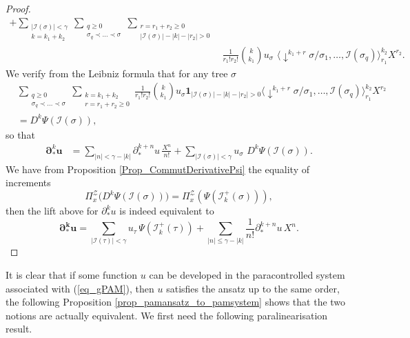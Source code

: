 \documentclass[11pt]{preprint}
\newcommand{\mcI}{\mathcal{I}}
\newcommand{\mcZ}{\mathcal{Z}}
\def\eqref#1{(\ref{#1})}
\renewcommand{\lg}{\langle}
\newcommand{\rg}{\rangle}
\begin{document}
\begin{proof}
\begin{align*}
				+ \sum_{\substack{|\mcI(\sigma)|<\gamma \\ k=k_1+k_2} }\sum_{\substack{q\geq 0 \\ \sigma_q\prec\dots\prec\sigma}} \sum_{\substack{ r=r_1+r_2 \geq0 \\ |\mcI(\sigma)|-|k|-|r_2|>0 }} \\ & \frac{1}{r_1!r_2!}\binom{k}{k_1}   u_\sigma \,\, \lg \downarrow^{k_1+r} \sigma/\sigma_1,\dots,\mcI(\sigma_q)    \rg^{k_2}_{r_1}X^{r_2} .
	\end{align*}
	We verify from the Leibniz formula that for any tree $\sigma$
	\begin{align*}&\sum_{\substack{q\geq 0 \\ \sigma_q\prec\dots\prec\sigma}}\sum_{\substack{k=k_1+k_2\\ r=r_1+r_2\geq 0}}\frac{1}{r_1!r_2!}\binom{k}{k_1} u_\sigma \mathbf{1}_{|\mcI(\sigma)|-|k|-|r_2|>0}\lg \downarrow^{k_1+r} \sigma/\sigma_1,\dots,\mcI(\sigma_q)    \rg^{k_2}_{r_1}X^{r_2} 
		\\
		&= D^k \Psi(\mcI(\sigma)),
		\end{align*}
	so that 
	\begin{align*}
		{\bm \partial_*^{k}}{\bm u} &= \sum_{|n|<\gamma-|k|}\partial_*^{k+n} u \, \frac{X^n}{n!} 
	+ \sum_{|\mcI(\sigma)|<\gamma } u_\sigma \,\, D^k\Psi(\mcI(\sigma)).
	\end{align*}
	We have from Proposition \ref{Prop_CommutDerivativePsi} the equality of increments $$\Pi_x^\mcZ\big( D^k\Psi(\mcI(\sigma))\big)=\Pi^\mcZ_x\left(\Psi(\mcI_k^+(\sigma))\right),$$ then the lift above for $\partial^k_*u$ is indeed equivalent to $$	\bm{\partial_{*}^{k} u} = \sum_{|\mcI(\tau)|<\gamma } u_\tau \, \Psi(\mcI_{k}^+ (\tau))  + \sum_{ |n|\leq \gamma - |k|} \frac{1}{n!}\partial_*^{k + n} u \, X^{n}.$$
	\end{proof}
	
	It is clear that if some function $u$ can be developed in the paracontrolled system associated with \eqref{eq_gPAM}, then $u$ satisfies the ansatz up to the same order, the following Proposition \ref{prop_pamansatz_to_pamsystem} shows that the two notions are actually equivalent. We first need the following paralinearisation result.
	
\end{document}

